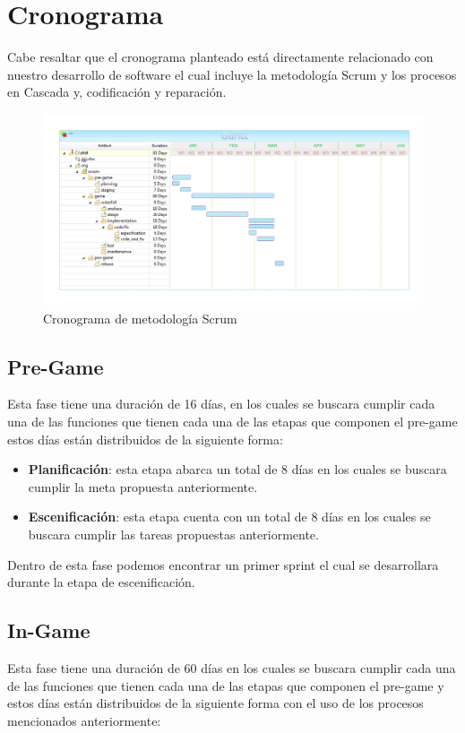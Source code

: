 \section{Cronograma}
Cabe resaltar que el cronograma planteado está directamente relacionado con nuestro desarrollo de software el cual incluye la metodología Scrum y los procesos en Cascada y, codificación y reparación.

\begin{figure}[h]
	\centering
	\includegraphics[scale=0.10,]{imagenes/Metodologia/cronograma.pdf}
	\caption{Cronograma de metodología Scrum }
	\label{fig:cronograma}
\end{figure}

\subsection{Pre-Game}
Esta fase tiene una duración de 16 días, en los cuales se buscara cumplir cada una de las funciones que tienen cada una de las etapas que componen el pre-game estos días están distribuidos de la siguiente forma:
\begin{itemize}
	\item \textbf{Planificación}: esta etapa abarca un total de 8 días en los cuales se buscara cumplir la meta propuesta anteriormente.
	\item \textbf{Escenificación}: esta etapa cuenta con  un total de 8 días en los cuales se buscara cumplir las tareas propuestas anteriormente.
	
\end{itemize}

Dentro de esta fase podemos encontrar un primer sprint el cual se desarrollara durante la etapa de escenificación.

\subsection{In-Game}
Esta fase tiene una duración de 60 días en los cuales se buscara cumplir cada una de las funciones que tienen cada una de las etapas que componen el pre-game y estos días están distribuidos de la siguiente forma con el uso de los procesos mencionados anteriormente:

